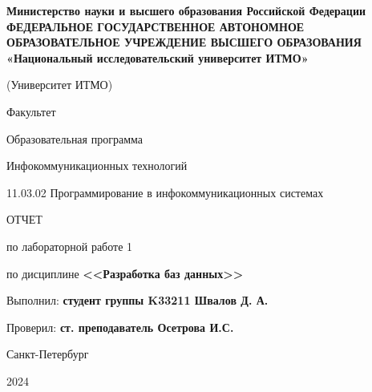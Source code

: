 \documentclass[a4paper, 14pt]{extarticle}
\begin{document}
\begin{titlepage}
  \vspace{0pt plus2fill}
  \noindent

  \vspace{0pt plus6fill}
  \begin{center}
    {
    \bfseries
    Министерство науки и высшего образования Российской Федерации
    {
    \scriptsize
    ФЕДЕРАЛЬНОЕ ГОСУДАРСТВЕННОЕ АВТОНОМНОЕ ОБРАЗОВАТЕЛЬНОЕ УЧРЕЖДЕНИЕ ВЫСШЕГО
    ОБРАЗОВАНИЯ
    }
    «Национальный исследовательский университет ИТМО»

    (Университет ИТМО)

    \begin{minipage}[t]{0.42\textwidth}
      \vspace*{0pt}
      \begin{flushright}
        Факультет

        Образовательная программа
      \end{flushright}
    \end{minipage}
    \begin{minipage}[t]{0.57\textwidth}
      \vspace*{0pt}
      \begin{flushright}
        Инфокоммуникационных технологий

        11.03.02 Программирование в инфокоммуникационных системах
      \end{flushright}
    \end{minipage}
    }

    \vspace{0pt plus5fill}

    \LARGE{
      ОТЧЕТ

      по лабораторной работе 1

      по дисциплине \textbf{<<Разработка баз данных>>}
    }
  \end{center}

  \vspace{0pt plus4fill}
  \begin{flushright}
    Выполнил: \textbf{студент группы K33211 Швалов Д. А.}

    Проверил: \textbf{ст. преподаватель Осетрова И.С.}
  \end{flushright}

  \vspace{0pt plus8fill}
  \begin{center}
    Санкт-Петербург

    2024
  \end{center}
\end{titlepage}
\end{document}
